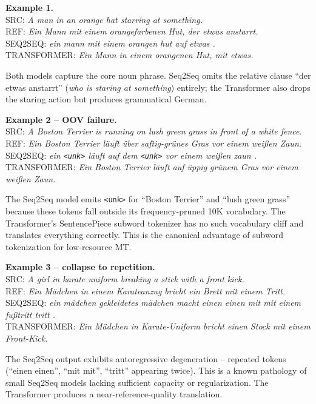 \documentclass[11pt,a4paper]{article}
\begin{document}
\textbf{Example 1.} \\
SRC: \textit{A man in an orange hat starring at something.}\\
REF: \textit{Ein Mann mit einem orangefarbenen Hut, der etwas anstarrt.}\\
SEQ2SEQ: \textit{ein mann mit einem orangen hut auf etwas .}\\
TRANSFORMER: \textit{Ein Mann in einem orangenen Hut, mit etwas.}

Both models capture the core noun phrase. Seq2Seq omits the relative clause ``der etwas anstarrt'' (\textit{who is staring at something}) entirely; the Transformer also drops the staring action but produces grammatical German.

\textbf{Example 2 -- OOV failure.}\\
SRC: \textit{A Boston Terrier is running on lush green grass in front of a white fence.}\\
REF: \textit{Ein Boston Terrier l\"auft \"uber saftig-gr\"unes Gras vor einem wei{\ss}en Zaun.}\\
SEQ2SEQ: \textit{ein \texttt{<unk>} l\"auft auf dem \texttt{<unk>} vor einem wei{\ss}en zaun .}\\
TRANSFORMER: \textit{Ein Boston Terrier l\"auft auf \"uppig gr\"unem Gras vor einem wei{\ss}en Zaun.}

The Seq2Seq model emits \texttt{<unk>} for ``Boston Terrier'' and ``lush green grass'' because these tokens fall outside its frequency-pruned 10K vocabulary. The Transformer's SentencePiece subword tokenizer has no such vocabulary cliff and translates everything correctly. This is the canonical advantage of subword tokenization for low-resource MT.

\textbf{Example 3 -- collapse to repetition.}\\
SRC: \textit{A girl in karate uniform breaking a stick with a front kick.}\\
REF: \textit{Ein M\"adchen in einem Karateanzug bricht ein Brett mit einem Tritt.}\\
SEQ2SEQ: \textit{ein m\"adchen gekleidetes m\"adchen macht einen einen mit mit einem fu{\ss}tritt tritt .}\\
TRANSFORMER: \textit{Ein M\"adchen in Karate-Uniform bricht einen Stock mit einem Front-Kick.}

The Seq2Seq output exhibits autoregressive degeneration -- repeated tokens (``einen einen'', ``mit mit'', ``tritt'' appearing twice). This is a known pathology of small Seq2Seq models lacking sufficient capacity or regularization. The Transformer produces a near-reference-quality translation.
\end{document}
